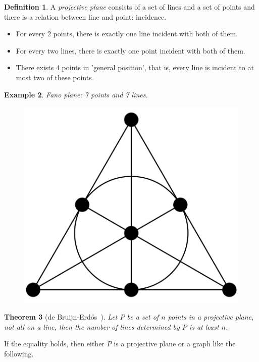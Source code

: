 \documentclass{article}
\newtheorem{theorem}{Theorem}[section]
\newtheorem{example}[theorem]{Example}
\theoremstyle{definition}
\newtheorem{definition}[theorem]{Definition}
\def\Erdos{Erd\H{o}s}
\begin{document}
\begin{definition}
    A \emph{projective plane} consists of a set of lines and a set of points and there is a relation between line and point: incidence.
    \begin{itemize}
    \item For every 2 points, there is exactly one line incident with both of them.
    \item For every two lines, there is exactly one point incident with both of them.
    \item There exists 4 points in 'general position', that is, every line is incident to at most two of these points.
\end{itemize}
\end{definition}

\begin{example}
Fano plane: 7 points and 7 lines.
 \begin{figure}[H]
        \centering
        \includegraphics[scale=0.2]{20-4.png}
    \end{figure}
\end{example}

\begin{theorem}[de Bruijn-\Erdos{}~\cite{bruijn1951colour}]
    Let $P$ be a set of $n$ points in a projective plane, not all on a line, then the number of lines determined by $P$ is at least $n$.
\end{theorem}

 If the equality holds, then either $P$ is a projective plane or a graph like the following.
\end{document}
